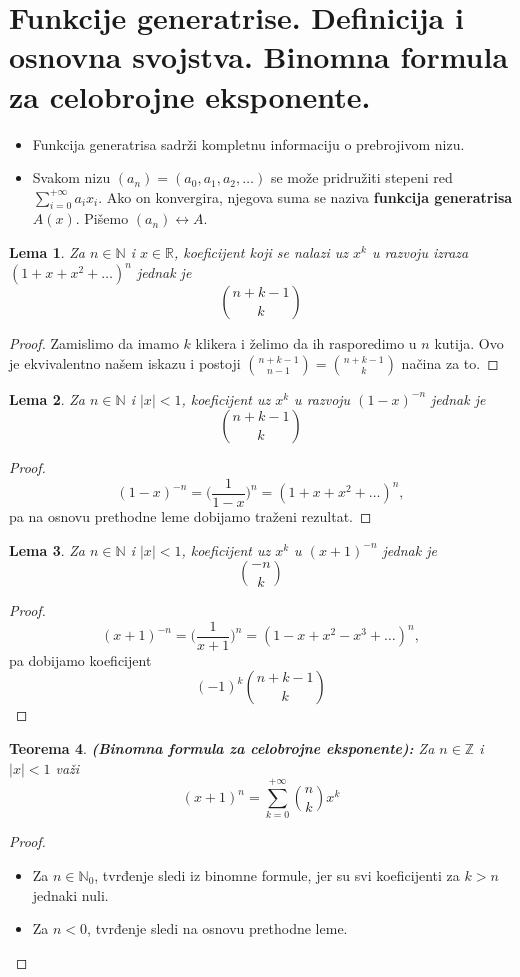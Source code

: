\documentclass[a4paper,12pt]{article}
\numberwithin{algorithm}{section}
\theoremstyle{plain}
\newtheorem{theorem}{Teorema}[section]
\newtheorem{lemma}[theorem]{Lema}
\theoremstyle{definition}
\theoremstyle{remark}
\begin{document}
\newpage
\section{Funkcije generatrise. Definicija i osnovna svojstva. Binomna formula za
celobrojne eksponente.}
\begin{itemize}
    \item Funkcija generatrisa sadrži kompletnu informaciju o prebrojivom nizu.
    \item Svakom nizu $(a_n) = (a_0, a_1, a_2, \ldots)$ se može pridružiti stepeni red $\sum_{i = 0}^{+\infty}a_ix_i$. Ako on konvergira, njegova suma se naziva \textbf{funkcija generatrisa} $A(x)$. Pišemo $(a_n) \leftrightarrow A$.
\end{itemize}
\begin{lemma}
    Za $n \in \mathbb{N}$ i $x \in \mathbb{R}$, koeficijent koji se nalazi uz $x^k$ u razvoju izraza $(1+x+x^2+\dots)^n$ jednak je
    \[ {{n + k - 1} \choose k} \]
\end{lemma}
\begin{proof}
    Zamislimo da imamo $k$ klikera i želimo da ih rasporedimo u $n$ kutija. Ovo je ekvivalentno našem iskazu i postoji ${{n + k -1} \choose {n-1}} = {{n + k - 1} \choose k}$ načina za to.
\end{proof}

\begin{lemma}
    Za $n \in \mathbb{N}$ i $|x| < 1$, koeficijent uz $x^k$ u razvoju $(1-x)^{-n}$ jednak je 
    \[ {{n+k-1} \choose k} \]
\end{lemma}
\begin{proof}
    \[
        (1-x)^{-n} = \bigg(\frac{1}{1-x}\bigg)^n = (1 + x + x^2 + \ldots)^n, 
    \]
    pa na osnovu prethodne leme dobijamo traženi rezultat.
\end{proof}
\begin{lemma}
    Za $n \in \mathbb{N}$ i $|x| < 1$, koeficijent uz $x^k$ u $(x+1)^{-n}$ jednak je
    \[ {{-n} \choose k} \]
\end{lemma}
\begin{proof}
    \[
        (x+1)^{-n} = \bigg( \frac{1}{x+1} \bigg)^n = (1 - x + x^2 - x^3 + \ldots)^n, 
    \]
    pa dobijamo koeficijent
    \[
        (-1)^k {{n + k - 1} \choose k}
    \]
\end{proof}

\begin{theorem}
    \textbf{(Binomna formula za celobrojne eksponente):} Za $n \in \mathbb{Z}$ i $|x| < 1$ važi
    \[ (x+1)^n = \sum_{k = 0}^{+\infty} {{n} \choose k}x^k \] 
\end{theorem}
\begin{proof}\
    \begin{itemize}
        \item Za $n \in \mathbb{N}_0$, tvrđenje sledi iz binomne formule, jer su svi koeficijenti za $k > n$ jednaki nuli.
        \item Za $n < 0$, tvrđenje sledi na osnovu prethodne leme.
    \end{itemize}
\end{proof}
\newpage
\end{document}
